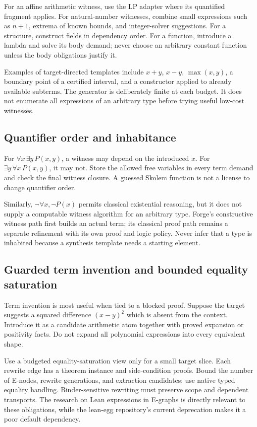 \documentclass[11pt,letterpaper]{article}
\theoremstyle{definition}\newtheorem{definition}[proposition]{Definition}
\begin{document}
For an affine arithmetic witness, use the LP adapter where its quantified fragment applies. For natural-number witnesses, combine small expressions such as $n+1$, extrema of known bounds, and integer-solver suggestions. For a structure, construct fields in dependency order. For a function, introduce a lambda and solve its body demand; never choose an arbitrary constant function unless the body obligations justify it.

Examples of target-directed templates include $x+y$, $x-y$, $\max(x,y)$, a boundary point of a certified interval, and a constructor applied to already available subterms. The generator is deliberately finite at each budget. It does not enumerate all expressions of an arbitrary type before trying useful low-cost witnesses.

\subsection{Quantifier order and inhabitance}
For $\forall x\,\exists y\,P(x,y)$, a witness may depend on the introduced $x$. For $\exists y\,\forall x\,P(x,y)$, it may not. Store the allowed free variables in every term demand and check the final witness closure. A guessed Skolem function is not a license to change quantifier order.

Similarly, $\neg\forall x,\neg P(x)$ permits classical existential reasoning, but it does not supply a computable witness algorithm for an arbitrary type. Forge's constructive witness path first builds an actual term; its classical proof path remains a separate refinement with its own proof and logic policy. Never infer that a type is inhabited because a synthesis template needs a starting element.

\subsection{Guarded term invention and bounded equality saturation}
Term invention is most useful when tied to a blocked proof. Suppose the target suggests a squared difference $(x-y)^2$ which is absent from the context. Introduce it as a candidate arithmetic atom together with proved expansion or positivity facts. Do not expand all polynomial expressions into every equivalent shape.

Use a budgeted equality-saturation view only for a small target slice. Each rewrite edge has a theorem instance and side-condition proofs. Bound the number of E-nodes, rewrite generations, and extraction candidates; use native typed equality handling. Binder-sensitive rewriting must preserve scope and dependent transports. The research on Lean expressions in E-graphs is directly relevant to these obligations, while the lean-egg repository's current deprecation makes it a poor default dependency.~\cite{egglean,leanegg}
\end{document}

